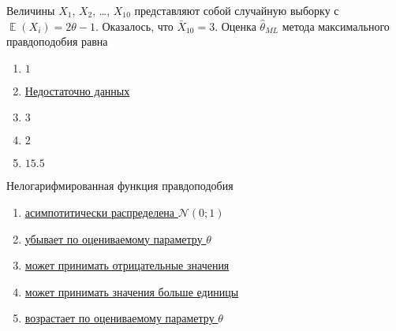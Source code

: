 \documentclass[t]{beamer}
\DeclareMathOperator{\E}{\mathbb{E}}
\newcommand{\cN}{\mathcal{N}}
\begin{document}
 \begin{frame} \label{14} 
\begin{block}{14} 

    Величины $X_1$, $X_2$, \ldots, $X_{10}$ представляют собой случайную выборку с $\E(X_i) = 2\theta - 1$. Оказалось, что $\bar X_{10}=3$. Оценка $\hat\theta_{ML}$ метода максимального правдоподобия равна
    

 \end{block} 
\begin{enumerate} 
\item[] \hyperlink{14-No}{\beamergotobutton{} $1$}
\item[] \hyperlink{14-Yes}{\beamergotobutton{} Недостаточно данных}
\item[] \hyperlink{14-No}{\beamergotobutton{} $3$}
\item[] \hyperlink{14-No}{\beamergotobutton{} $2$}
\item[] \hyperlink{14-No}{\beamergotobutton{} $15.5$}
\end{enumerate} 
\end{frame} 


 \begin{frame} \label{15} 
\begin{block}{15} 

  Нелогарифмированная функция правдоподобия
  

 \end{block} 
\begin{enumerate} 
\item[] \hyperlink{15-No}{\beamergotobutton{} асимпотитически распределена $\cN(0;1)$}
\item[] \hyperlink{15-No}{\beamergotobutton{} убывает по оцениваемому параметру $\theta$}
\item[] \hyperlink{15-No}{\beamergotobutton{} может принимать отрицательные значения}
\item[] \hyperlink{15-Yes}{\beamergotobutton{} может принимать значения больше единицы}
\item[] \hyperlink{15-No}{\beamergotobutton{} возрастает по оцениваемому параметру $\theta$}
\end{enumerate} 
\end{frame} 
\end{document}
